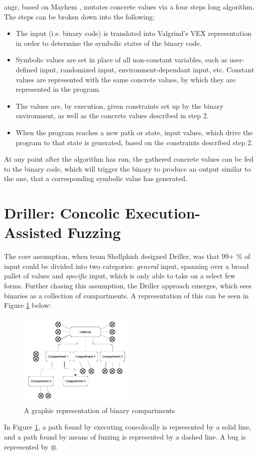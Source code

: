 \documentclass[a4paper]{article}
\newcommand{\tit}[1]{\textit{#1}}
\begin{document}
angr, based on Mayhem \cite{Mayhem}, mutates concrete values via a four
steps long algorithm. The steps can be broken down into the following:
\begin{itemize}
	\item[1] The input (i.e. binary code) is translated into Valgrind's VEX \cite{VEX} representation in order to determine the symbolic states of the binary code.
	\item[2] Symbolic values are set in place of all non-constant variables, such as user-defined input, randomized input, environment-dependant input, etc. Constant values are represented with the same concrete values, by which they are represented in the program.
	\item[3] The values are, by execution, given constraints set up by the binary environment, as well as the concrete values described in step 2.
	\item[4] When the program reaches a new path or state, input values, which drive the program to that state is generated, based on the constraints described step 2.
\end{itemize}
At any point after the algorithm has run, the gathered concrete values can be fed to the binary code, which will trigger the binary to produce an output similar to the one, that a corresponding symbolic value has generated.
\section{Driller: Concolic Execution-Assisted Fuzzing}
The core assumption, when team Shellphish designed Driller, was that 99+ \% of input could be divided into two categories: \tit{general} input, spanning over a broad pallet of values and \tit{specific} input, which is only able to take on a select few forms. Further chasing this assumption, the Driller approach emerges, which sees binaries as a collection of compartments. A representation of this can be seen in Figure \ref{Compartments} below:
\begin{figure}[H]
	\centering
	\includegraphics[width=0.5\textwidth]{Compartments}
	\caption{A graphic representation of binary compartments}
	\label{Compartments}
\end{figure}
\noindent
In Figure \ref{Compartments}, a path found by executing concolically is represented by a solid line, and a path found by means of fuzzing is represented by a dashed line. A bug is represented by $\otimes$. 
\end{document}
